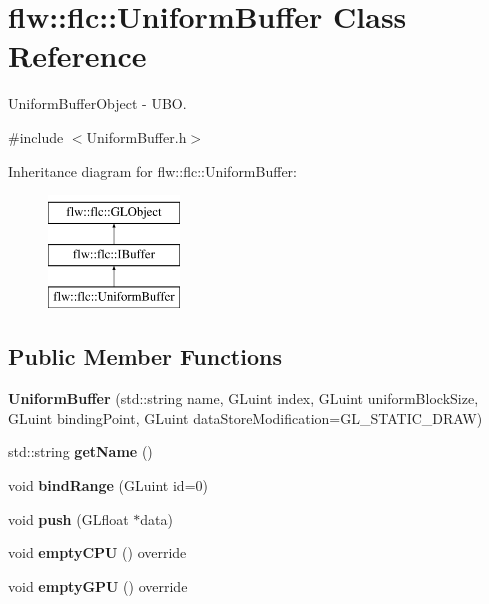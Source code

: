 \hypertarget{classflw_1_1flc_1_1UniformBuffer}{}\section{flw\+:\+:flc\+:\+:Uniform\+Buffer Class Reference}
\label{classflw_1_1flc_1_1UniformBuffer}


Uniform\+Buffer\+Object -\/ U\+BO.  




{\ttfamily \#include $<$Uniform\+Buffer.\+h$>$}

Inheritance diagram for flw\+:\+:flc\+:\+:Uniform\+Buffer\+:\begin{figure}[H]
\begin{center}
\leavevmode
\includegraphics[height=3.000000cm]{classflw_1_1flc_1_1UniformBuffer}
\end{center}
\end{figure}
\subsection*{Public Member Functions}
\begin{DoxyCompactItemize}
\item 
\mbox{\label{classflw_1_1flc_1_1UniformBuffer_a8827d977ec5627f4e45c547e5503f6a4}} 
{\bfseries Uniform\+Buffer} (std\+::string name, G\+Luint index, G\+Luint uniform\+Block\+Size, G\+Luint binding\+Point, G\+Luint data\+Store\+Modification=G\+L\+\_\+\+S\+T\+A\+T\+I\+C\+\_\+\+D\+R\+AW)
\item 
\mbox{\label{classflw_1_1flc_1_1UniformBuffer_a1b2f21d79ebd22f4179edea021638c37}} 
std\+::string {\bfseries get\+Name} ()
\item 
\mbox{\label{classflw_1_1flc_1_1UniformBuffer_a54cf75c1395c83d2a2aa8ab77aba2fbc}} 
void {\bfseries bind\+Range} (G\+Luint id=0)
\item 
\mbox{\label{classflw_1_1flc_1_1UniformBuffer_a343329c21e2a69521a76ffa025cae19f}} 
void {\bfseries push} (G\+Lfloat $\ast$data)
\item 
\mbox{\label{classflw_1_1flc_1_1UniformBuffer_a26443bd469d8c144355f5f8fd388ac5d}} 
void {\bfseries empty\+C\+PU} () override
\item 
\mbox{\label{classflw_1_1flc_1_1UniformBuffer_a8b4855883142bdab8924217d8f3938a0}} 
void {\bfseries empty\+G\+PU} () override
\end{DoxyCompactItemize}
